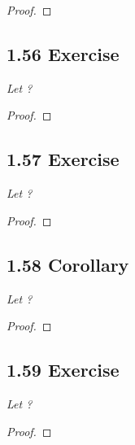\documentclass{article}
\begin{document}
\begin{proof}
\end{proof}

\subsection*{1.56 Exercise} 
\quad \textit{Let ?}

\begin{proof}
\end{proof}

\subsection*{1.57 Exercise} 
\quad \textit{Let ?}

\begin{proof}
\end{proof}

\subsection*{1.58 Corollary} 
\quad \textit{Let ?}

\begin{proof}
\end{proof}

\subsection*{1.59 Exercise} 
\quad \textit{Let ?}

\begin{proof}
\end{proof}
\end{document}
